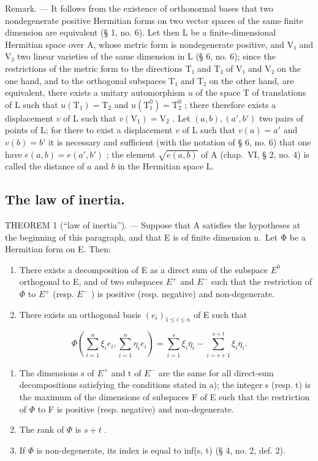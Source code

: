 Remark. --- It follows from the existence of orthonormal bases that two nondegenerate positive Hermitian forms on two vector spaces of the same finite dimension are equivalent (§ 1, no. 6). Let then L be a finite-dimensional Hermitian space over A, whose metric form is nondegenerate positive, and V₁ and V₂ two linear varieties of the same dimension in L (§ 6, no. 6); since the restrictions of the metric form to the directions T₁ and T₂ of V₁ and V₂ on the one hand, and to the orthogonal subspaces T₁ and T₂ on the other hand, are equivalent, there exists a unitary automorphism \(u\) of the space T of translations of L such that \(u(\mathrm{T}_1) = \mathrm{T}_2\) and \(u(\mathrm{T}_1^0) = \mathrm{T}_2^0\) ; there therefore exists a displacement \(v\) of L such that \(v(\mathrm{V}_1) = \mathrm{V}_2\) . Let \((a, b), (a', b')\) two pairs of points of L; for there to exist a displacement \(v\) of L such that \(v(a) = a'\) and \(v(b) = b'\) it is necessary and sufficient (with the notation of § 6, no. 6) that one have \(e(a, b) = e(a', b')\) ; the element \(\sqrt{e(a, b)}\) of A (chap.~VI, § 2, no. 4) is called the distance of \(a\) and \(b\) in the Hermitian space L.

\subsection{The law of inertia.}

THEOREM 1 (“law of inertia”). --- Suppose that A satisfies the hypotheses at the beginning of this paragraph, and that E is of finite dimension n.~Let Φ be a Hermitian form on E. Then:

\begin{enumerate}
\def\labelenumi{\alph{enumi})}
\item
  There exists a decomposition of E as a direct sum of the subspace \(E^{0}\) orthogonal to E, and of two subspaces \(E^{+}\) and \(E^{-}\) such that the restriction of \(\Phi\) to \(E^{+}\) (resp. \(E^{-}\) ) is positive (resp. negative) and non-degenerate.
\item
  There exists an orthogonal basis \((e_i)_{1\leqslant i\leqslant n}\) of E such that
\end{enumerate}

\[
\Phi (\sum_ {i = 1} ^ {n} \xi_ {i} e _ {i}, \sum_ {i = 1} ^ {n} \eta_ {i} e _ {i}) = \sum_ {i = 1} ^ {s} \xi_ {i} \overline {{\eta}} _ {i} - \sum_ {i = s + 1} ^ {s + t} \xi_ {i} \overline {{\eta}} _ {i}.\tag{2}
\]

\begin{enumerate}
\def\labelenumi{\alph{enumi})}
\setcounter{enumi}{2}
\item
  The dimensions s of \(E^{+}\) and t of \(E^{-}\) are the same for all direct-sum decompositions satisfying the conditions stated in a); the integer s (resp. t) is the maximum of the dimensions of subspaces F of E such that the restriction of \(\Phi\) to F is positive (resp. negative) and non-degenerate.
\item
  The rank of \(\Phi\) is \(s + t\) .
\item
  If \(\Phi\) is non-degenerate, its index is equal to inf(s, t) (§ 4, no. 2, def. 2).
\end{enumerate}

